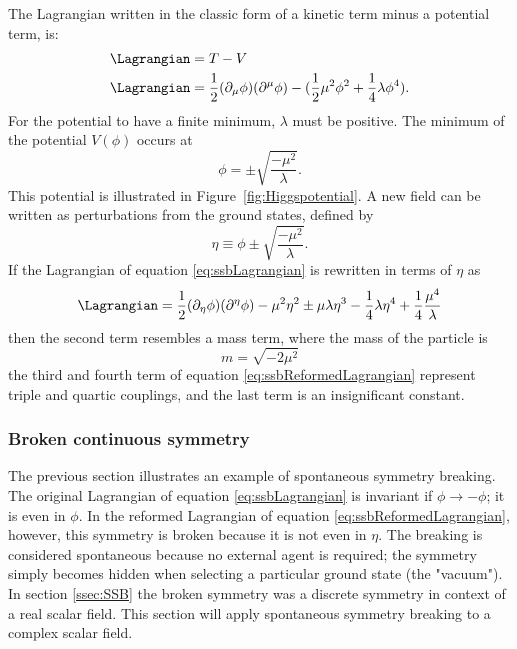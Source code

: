The Lagrangian written in the classic form of a kinetic term minus a potential term, is:
\begin{align}
    \Lagrangian & = T-V\\
    \Lagrangian & = \dfrac{1}{2}(\partial_{\mu}\phi)(\partial^{\mu}\phi)-(\dfrac{1}{2}\mu^2\phi^2+\dfrac{1}{4}\lambda\phi^4).
    \label{eq:ssbLagrangian}
\end{align}
For the potential to have a finite minimum, $\lambda$ must be positive. The minimum of the potential $V(\phi)$ occurs at 
\begin{equation}
    \phi=\pm\sqrt{\dfrac{-\mu^2}{\lambda}}.
\end{equation}
This potential is illustrated in Figure~\ref{fig:Higgspotential}.
A new field can be written as perturbations from the ground states, defined by 
\begin{equation}
    \eta\equiv\phi\pm\sqrt{\dfrac{-\mu^2}{\lambda}}.
\end{equation}
If the Lagrangian of equation \ref{eq:ssbLagrangian} is rewritten in terms of $\eta$ as
\begin{equation} \label{eq:ssbReformedLagrangian}
    \Lagrangian=\dfrac{1}{2}(\partial_{\eta}\phi)(\partial^{\eta}\phi) - \mu^2\eta^2\pm\mu\lambda\eta^3-\dfrac{1}{4}\lambda\eta^4+\dfrac{1}{4}\dfrac{\mu^4}{\lambda}
\end{equation}
then the second term resembles a mass term, where the mass of the particle is 
\begin{equation}
    m=\sqrt{-2\mu^2}
\end{equation}
the third and fourth term of equation \ref{eq:ssbReformedLagrangian} represent triple and quartic couplings, and the last term is an insignificant constant. 

\subsubsection{Broken continuous symmetry}

The previous section illustrates an example of spontaneous symmetry breaking. The original Lagrangian of equation \ref{eq:ssbLagrangian} is invariant if $\phi\rightarrow-\phi$; it is even in $\phi$. In the reformed Lagrangian of equation \ref{eq:ssbReformedLagrangian}, however, this symmetry is broken because it is not even in $\eta$. The breaking is considered spontaneous because no external agent is required; the symmetry simply becomes hidden when selecting a particular ground state (the "vacuum"). In section \ref{ssec:SSB} the broken symmetry was a discrete symmetry in context of a real scalar field. This section will apply spontaneous symmetry breaking to a complex scalar field.

